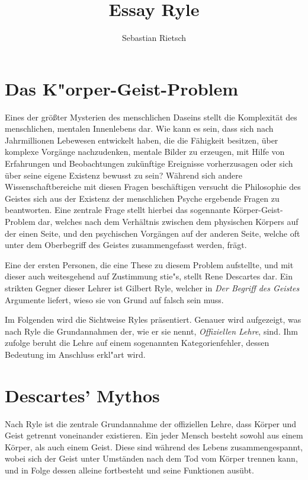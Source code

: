 \documentclass[a4paper]{article}
\title{Essay Ryle}
\date{}
\author{Sebastian Rietsch}
\begin{document}
\maketitle
\section{Das K"orper-Geist-Problem}
Eines der größter Mysterien des menschlichen Daseins stellt die Komplexität des menschlichen, mentalen Innenlebens dar. Wie kann es sein, dass sich nach Jahrmillionen Lebewesen entwickelt haben, die die Fähigkeit besitzen, über komplexe Vorgänge nachzudenken, mentale Bilder zu erzeugen, mit Hilfe von Erfahrungen und Beobachtungen zukünftige Ereignisse vorherzusagen oder sich über seine eigene Existenz bewusst zu sein? Während sich andere Wissenschaftbereiche mit diesen Fragen beschäftigen versucht die Philosophie des Geistes sich aus der Existenz der menschlichen Psyche ergebende Fragen zu beantworten. Eine zentrale Frage stellt hierbei das sogennante Körper-Geist-Problem dar, welches nach dem Verhältnis zwischen dem physischen Körpers auf der einen Seite, und den psychischen Vorgängen auf der anderen Seite, welche oft unter dem Oberbegriff des Geistes zusammengefasst werden, frägt. 

Eine der ersten Personen, die eine These zu diesem Problem aufstellte, und mit dieser auch weitesgehend auf Zustimmung stie"s, stellt Rene Descartes dar. 
Ein strikten Gegner dieser Lehrer ist Gilbert Ryle, welcher in \textit{\glqq Der Begriff des Geistes\grqq{}} Argumente liefert, wieso sie von Grund auf falsch sein muss. 

Im Folgenden wird die Sichtweise Ryles präsentiert. Genauer wird aufgezeigt, was nach Ryle die Grundannahmen der, wie er sie nennt, \textit{\glqq Offiziellen Lehre\grqq{}}, sind. Ihm zufolge beruht die Lehre auf einem sogenannten Kategorienfehler, dessen Bedeutung im Anschluss erkl"art wird.

\section{Descartes' Mythos}
Nach Ryle ist die zentrale Grundannahme der offiziellen Lehre, dass Körper und Geist getrennt voneinander existieren. Ein jeder Mensch besteht sowohl aus einem Körper, als auch einem Geist. Diese sind während des Lebens zusammengespannt, wobei sich der Geist unter Umständen nach dem Tod vom Körper trennen kann, und in Folge dessen alleine fortbesteht und seine Funktionen ausübt.  
\end{document}

